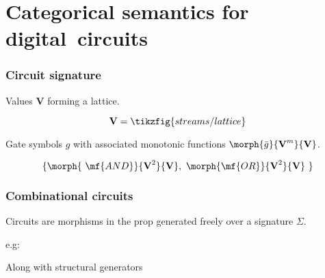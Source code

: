 \section{Categorical semantics for digital~circuits}

\begin{frame}
    \frametitle{Circuit signature}

    \pause

    \alert{Values} $\textbf{V}$ forming a lattice.

    \pause

    \[\textbf{V} = \tikzfig{streams/lattice}\]

    \pause

    \alert{Gate symbols} $g$ with associated monotonic functions $\morph{\bar{g}}{\textbf{V}^m}{\textbf{V}}$.

    \pause

    \[\{\morph{\ \mf{AND}}{\textbf{V}^2}{\textbf{V}},\ \morph{\mf{OR}}{\textbf{V}^2}{\textbf{V}}\ \}\]

\end{frame}

\begin{frame}
    \frametitle{Combinational circuits}

    \pause

    Circuits are \alert{morphisms} in the prop generated freely over a signature $\Sigma$.

    \pause

    e.g:

    \begin{center}

        \pause

        \vspace{1em}

    \end{center}

    \vspace{1em}

    \pause

    Along with \alert{structural} generators 

    \begin{center}
        \quad
        \quad
    \end{center}

\end{frame}

